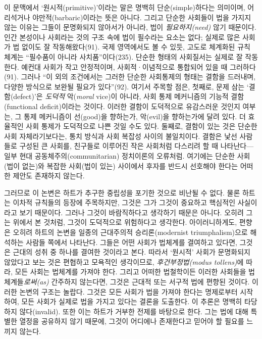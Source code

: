 \documentclass[12pt, oneside]{book}  %
\begin{document}
이 문맥에서 `원시적(primitive)'이라는 말은 명백히 단순(simple)하다는
의미이며, 어리석거나 야만적(barbaric)이라는 뜻은 아니다. 그리고 단순한
사회들이 법을 가지지 않는 이유는 그들이 문명화되지 않아서가 아니라, 법이
\emph{필요하지(need)} 않기 때문이다. 인간 본성이나 사회라는 것의 구조
속에 법이 필수라는 요소는 없다; 실제로 많은 사회가 법 없이도 잘
작동해왔다(91). 국제 영역에서도 볼 수 있듯, 고도로 체계화된 규칙 체계는
``필수품이 아니라 사치품''이다(235). 단순한 형태의 사회질서는 실제로 잘
작동한다. 예컨대 사회가 작고 안정적이며, 사회적·이념적으로 통합되어 있을
때 그러하다(91). 그러나 ``이 외의 조건에서는 그러한 단순한 사회통제의
형태는 결함을 드러내며, 다양한 방식으로 보완될 필요가 있다''(92). 여기서
주목할 점은, 첫째로, 문제 삼는 `결함(defect)'은 \emph{도덕적}
악(\emph{moral} vice)이 아니라, 사회 통제 메커니즘의 기능적
결함(functional deficit)이라는 것이다. 이러한 결함이 도덕적으로
유감스러운 것인지 여부는, 그 통제 메커니즘이 선(good)을 향하는가,
악(evil)을 향하는가에 달려 있다. 더 효율적인 사회 통제가 도덕적으로 나쁜
것일 수도 있다. 둘째로, 결함이 있는 것은 단순한 사회 자체라기보다는,
통치 방식과 사회 복잡성 사이의 불일치이다. 결함은 낯선 사람들로 구성된
큰 사회를, 친구들로 이루어진 작은 사회처럼 다스리려 할 때
나타난다---일부 현대 공동체주의(communitarian) 정치이론의 오류처럼.
여기에는 단순한 사회(법이 없는)와 복잡한 사회(법이 있는) 사이에서 후자를
반드시 선호해야 한다는 어떠한 제안도 존재하지 않는다.

그러므로 이 논변은 하트가 추구한 중립성을 포기한 것으로 비난될 수 없다.
물론 하트는 이차적 규칙들의 등장에 주목하지만, 그것은 그가 그것이
중요하고 핵심적인 사실이라고 보기 때문이다. 그러나 그것이 바람직하다고
생각하기 때문은 아니다. 오히려 그는 위에서 본 것처럼, 그것이 도덕적으로
위험하다고 생각한다. 아이러니하게도, 편향은 오히려 하트의 논변을 일종의
근대주의적 승리론(modernist triumphalism)으로 해석하는 사람들 쪽에서
나타난다. 그들은 어떤 사회가 법체계를 결여하고 있다면, 그것은 근대의
성취 중 하나를 결여한 것이라고 본다. 따라서 `원시적' 사회가 문명화되지
않았다고 보는 것은 편협하고 모욕적인 생각이므로, \emph{후건부정법(modus
tollens)}에 따라, 모든 사회는 법체계를 가져야 한다. 그리고 어떠한
법철학이든 이러한 사회들을 법체계들\emph{로써(as)} 간주하지 않는다면,
그것은 근대적 또는 서구적 법에 편향된 것이다. 이러한 논변의 구조는
놀랍다. 그것은 모든 사회가 법을 가져야 한다는 명제로부터 시작하여, 모든
사회가 실제로 법을 가지고 있다는 결론을 도출한다. 이 추론은 명백히
타당하지 않다(invalid). 또한 이는 하트가 거부한 전제를 바탕으로 한다.
그는 법에 대해 특별한 열정을 공유하지 않기 때문에, 그것이 어디에나
존재한다고 믿어야 할 필요를 느끼지 않는다.
\end{document}

